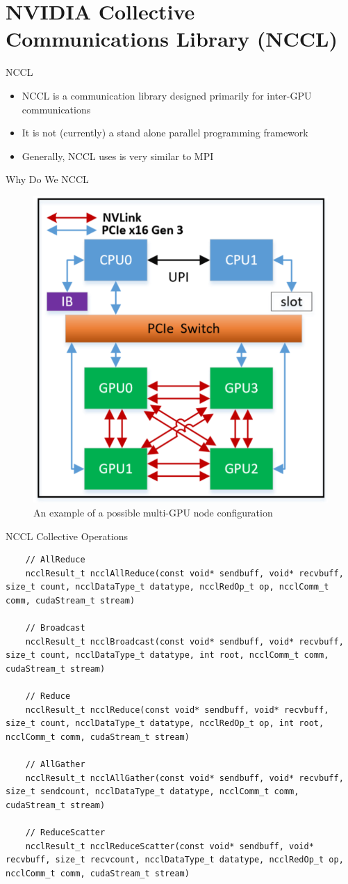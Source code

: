 \section{NVIDIA Collective Communications Library (NCCL)}

\begin{frame}{NCCL}
\begin{itemize}
\item NCCL is a communication library designed primarily for inter-GPU communications
\item It is not (currently) a stand alone parallel programming framework 
\item Generally, NCCL uses is very similar to MPI
\end{itemize}
\end{frame}

\begin{frame}{Why Do We NCCL}
	\begin{figure}
		\centering
		\includegraphics[width=0.45\linewidth]{figures/example_gpu_node_interconnect.png}
		\caption{An example of a possible multi-GPU node configuration}
	\end{figure}
\end{frame}

\begin{frame}[fragile]{NCCL Collective Operations}

\begin{verbatim}
	// AllReduce
	ncclResult_t ncclAllReduce(const void* sendbuff, void* recvbuff, size_t count, ncclDataType_t datatype, ncclRedOp_t op, ncclComm_t comm, cudaStream_t stream)
	
	// Broadcast
	ncclResult_t ncclBroadcast(const void* sendbuff, void* recvbuff, size_t count, ncclDataType_t datatype, int root, ncclComm_t comm, cudaStream_t stream)
	
	// Reduce
	ncclResult_t ncclReduce(const void* sendbuff, void* recvbuff, size_t count, ncclDataType_t datatype, ncclRedOp_t op, int root, ncclComm_t comm, cudaStream_t stream)
	
	// AllGather
	ncclResult_t ncclAllGather(const void* sendbuff, void* recvbuff, size_t sendcount, ncclDataType_t datatype, ncclComm_t comm, cudaStream_t stream)
	
	// ReduceScatter
	ncclResult_t ncclReduceScatter(const void* sendbuff, void* recvbuff, size_t recvcount, ncclDataType_t datatype, ncclRedOp_t op, ncclComm_t comm, cudaStream_t stream)
\end{verbatim}
\end{frame}

